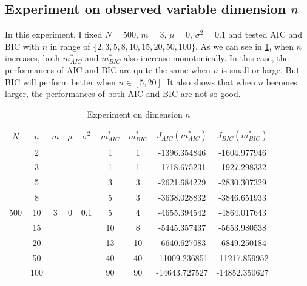 \documentclass{article}
\begin{document}
\subsection{Experiment on observed variable dimension $n$}
In this experiment, I fixed $N=500$, $m=3$, $\mu=0$, $\sigma^2=0.1$ and tested AIC and BIC with $n$ in range of $\{2, 3, 5, 8, 10, 15, 20, 50, 100\}$.
As we can see in \ref{n}, when $n$ increases, both $m_{AIC}^*$ and $m_{BIC}^*$ also increase monotonically. In this case, the performances of AIC and BIC are quite the same when $n$ is small or large. But BIC will perform better when $n\in[5, 20]$.
It also shows that when $n$ becomes larger, the performances of both AIC and BIC are not so good.
\begin{table}[htbp]
	\centering
	\newcommand{\tabincell}[2]{\begin{tabular}{@{}#1@{}}#2\end{tabular}}
	\renewcommand\arraystretch{1.0}
	\caption{Experiment on dimension $n$}
	\label{n}%
	\begin{tabular}{c|c|c|c|c|c|c|c|c}
    $N$ & $n$ & $m$ & $\mu$ & $\sigma^2$ & $m^*_{AIC}$ & $m^*_{BIC}$ & $J_{AIC}(m^*_{AIC})$ &$J_{BIC}(m^*_{BIC})$\\
    \hline
		\multirow{9}{*}{500} & 2 & \multirow{9}{*}{3} & \multirow{9}{*}{0} & \multirow{9}{*}{0.1} & 1 & 1 & -1396.354846 & -1604.977946\\
     & 3 & & & & 1 & 1 & -1718.675231 & -1927.298332\\
     & 5 & & & & 3 & 3 & -2621.684229 & -2830.307329\\
     & 8 & & & & 5 & 3 & -3638.028832 & -3846.651933\\
     & 10 & & & & 5 & 4 & -4655.394542 & -4864.017643\\
     & 15 & & & & 10 & 8 & -5445.357437 & -5653.980538\\
     & 20 & & & & 13 & 10 & -6640.627083 & -6849.250184\\
     & 50 & & & & 40 & 40 & -11009.236851 & -11217.859952\\
     & 100 & & & & 90 & 90 & -14643.727527 & -14852.350627\\
		\hline
\end{tabular}
\end{table}
\end{document}
